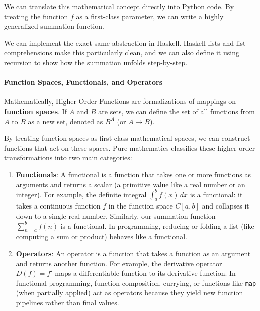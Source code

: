 We can translate this mathematical concept directly into Python code. By treating the function $f$ as a first-class parameter, we can write a highly generalized summation function.



We can implement the exact same abstraction in Haskell. Haskell lists and list comprehensions make this particularly clean, and we can also define it using recursion to show how the summation unfolds step-by-step.



\paragraph{Function Spaces, Functionals, and Operators}

Mathematically, Higher-Order Functions are formalizations of mappings on \textbf{function spaces}. If $A$ and $B$ are sets, we can define the set of all functions from $A$ to $B$ as a new set, denoted as $B^A$ (or $A \to B$). 

By treating function spaces as first-class mathematical spaces, we can construct functions that act on these spaces. Pure mathematics classifies these higher-order transformations into two main categories:
\begin{enumerate}
    \item \textbf{Functionals}: A functional is a function that takes one or more functions as arguments and returns a scalar (a primitive value like a real number or an integer). For example, the definite integral $\int_{a}^{b} f(x)\,dx$ is a functional: it takes a continuous function $f$ in the function space $C[a, b]$ and collapses it down to a single real number. Similarly, our summation function $\sum_{n=a}^{b} f(n)$ is a functional. In programming, reducing or folding a list (like computing a sum or product) behaves like a functional.
    \item \textbf{Operators}: An operator is a function that takes a function as an argument and returns another function. For example, the derivative operator $D(f) = f'$ maps a differentiable function to its derivative function. In functional programming, function composition, currying, or functions like \texttt{map} (when partially applied) act as operators because they yield new function pipelines rather than final values.
\end{enumerate}

